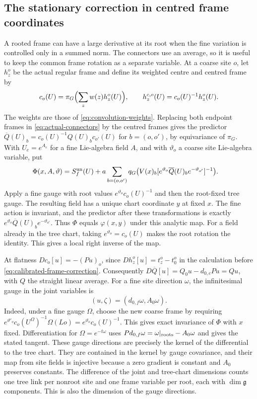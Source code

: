 \documentclass[11pt,reqno]{amsart}
\numberwithin{equation}{section}
\theoremstyle{definition}
\theoremstyle{remark}
\newcommand{\g}{\mathfrak g}
\begin{document}
\subsection{The stationary correction in centred frame coordinates}

A rooted frame can have a large derivative at its root when the
fine variation is controlled only in a summed norm. The connectors
use an average, so it is useful to keep the common frame rotation
as a separate variable. At a coarse site \(o\), let \(h_z^o\) be
the actual regular frame and define its weighted centre and
centred frame by
\[
 c_o(U)=\pi_G\Bigl(\sum_z w(z)h_z^o(U)\Bigr),\qquad
 h_z^{c,o}(U)=c_o(U)^{-1}h_z^o(U).
\]
The weights are those of \eqref{eq:convolution-weights}.
Replacing both endpoint frames in
\eqref{eq:actual-connectors} by the centred frames gives the
predictor \(\overline Q(U)_b=c_o(U)^{-1}Q(U)_b c_{o'}(U)\)
for \(b=(o,o')\), by equivariance of \(\pi_G\).
With \(U_e=e^{A_e}\) for a fine Lie-algebra field \(A\), and with
\(\vartheta_o\) a coarse site Lie-algebra variable, put
\begin{equation}
 \begin{split}
 \Phi(x,A,\vartheta)
  ={}&S_f^{\rm un}(U)+a\sum_{b=(o,o')}
     q_G\bigl(V(x)_b
          [e^{\vartheta_o}\overline Q(U)_b e^{-\vartheta_{o'}}]^{-1}\bigr).
 \end{split}
 \label{eq:quartic-centred-phase}
\end{equation}
Apply a fine gauge with root values \(e^{\vartheta_o}c_o(U)^{-1}\)
and then the root-fixed tree gauge. The resulting field has a
unique chart coordinate \(y\) at fixed \(x\). The fine action
is invariant, and the predictor after these transformations is
exactly \(e^{\vartheta_o}\overline Q(U)_b e^{-\vartheta_{o'}}\).
Thus \(\Phi\) equals \(\varphi(x,y)\) under this analytic map.
For a field already in the tree chart, taking
\(e^{\vartheta_o}=c_o(U)\) makes the root rotation the
identity. This gives a local right inverse of the map.

At flatness \(Dc_o[u]=-(Pu)_o\), since \(Dh_z^o[u]=t_z^o-t_0^o\)
in the calculation before \eqref{eq:calibrated-frame-correction}.
Consequently \(D\overline Q[u]=Q_0u-d_{0,c}Pu=Qu\), with \(Q\)
the straight linear average. For a fine site direction \(\omega\),
the infinitesimal gauge in the joint variables is
\[
            (u,\zeta)=(d_{0,f}\omega,A_0\omega).
\]
Indeed, under a fine gauge \(\Omega\), choose the new coarse
frame by requiring
\(e^{\vartheta'_o}c_o(U^\Omega)^{-1}\Omega(Lo)
   =e^{\vartheta_o}c_o(U)^{-1}\).
This gives exact invariance of \(\Phi\) with \(x\) fixed.
Differentiation for \(\Omega=e^{-t\omega}\) uses
\(Pd_{0,f}\omega=\omega|_{\rm roots}-A_0\omega\)
and gives the stated tangent. These gauge directions are precisely
the kernel of the differential to the tree chart. They are
contained in the kernel by gauge covariance, and their map
from site fields is injective because a zero gradient is constant
and \(A_0\) preserves constants. The difference of the joint
and tree-chart dimensions counts one tree link per nonroot
site and one frame variable per root, each with \(\dim\g\)
components. This is also the dimension of the gauge directions.
\end{document}

